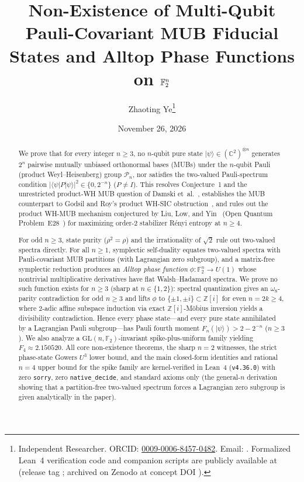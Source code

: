 \documentclass[11pt,a4paper]{article}
\title{\vspace*{-1.0cm}\bfseries Non-Existence of Multi-Qubit Pauli-Covariant MUB Fiducial States and Alltop Phase Functions on \texorpdfstring{$\F_2^n$}{F2\^{}n}}
\author{Zhaoting Ye\thanks{\raggedright Independent Researcher. ORCID: \href{https://orcid.org/0009-0006-8457-0482}{0009-0006-8457-0482}. Email: \href{mailto:lingyenbird@qq.com}{\lean{lingyenbird@qq.com}}. Formalized Lean~4 verification code and companion scripts are publicly available at \repoURL{} (release tag \lean{v1.1}; archived on Zenodo at concept DOI \href{https://doi.org/10.5281/zenodo.24566133}{\lean{10.5281/zenodo.24566133}}).}}
\date{November 26, 2026}
\theoremstyle{plain}
\theoremstyle{definition}
\theoremstyle{remark}
\newcommand{\C}{\mathbb{C}}
\newcommand{\F}{\mathbb{F}}
\newcommand{\Pauli}{\mathcal{P}}
\newcommand{\Zi}{\mathbb{Z}[i]}
\newcommand{\Uone}{U(1)}
\newcommand{\GL}{\mathrm{GL}}
\newcommand{\ket}[1]{|#1\rangle}
\newcommand{\expval}[2]{\langle#1|#2|#1\rangle}
\newcommand{\abs}[1]{\lvert#1\rvert}
\numberwithin{equation}{section}
\begin{document}
\maketitle
\vspace*{-3.2ex}

\begin{abstract}
We prove that for every integer $n \ge 3$, no $n$-qubit pure state $\ket{\psi} \in (\C^2)^{\otimes n}$ generates $2^n$ pairwise mutually unbiased orthonormal bases (MUBs) under the $n$-qubit Pauli (product Weyl--Heisenberg) group $\Pauli_n$, nor satisfies the two-valued Pauli-spectrum condition $\abs{\expval{\psi}{P}}^2 \in \{0, 2^{-n}\}$ ($P \neq I$). This resolves Conjecture~1 and the unrestricted product-WH MUB question of Damski et~al.~\cite{damski2026product}, establishes the MUB counterpart to Godsil and Roy's product WH-SIC obstruction~\cite{godsil2009equiangular}, and rules out the product WH-MUB mechanism conjectured by Liu, Low, and Yin~\cite{liu2026maximal} (Open Quantum Problem~E28~\cite{oqpE28}) for maximizing order-$2$ stabilizer R\'enyi entropy at $n \ge 4$.

For odd $n \ge 3$, state purity ($\rho^2 = \rho$) and the irrationality of $\sqrt{2}$ rule out two-valued spectra directly. For all $n \ge 1$, symplectic self-duality equates two-valued spectra with Pauli-covariant MUB partitions (with Lagrangian zero subgroup), and a matrix-free symplectic reduction produces an \emph{Alltop phase function} $\phi : \F_2^n \to \Uone$ whose nontrivial multiplicative derivatives have flat Walsh--Hadamard spectra. We prove no such function exists for $n \ge 3$ (sharp at $n \in \{1, 2\}$): spectral quantization gives an $\omega_8$-parity contradiction for odd $n \ge 3$ and lifts $\phi$ to $\{\pm 1, \pm i\} \subset \Zi$ for even $n = 2k \ge 4$, where $2$-adic affine subspace induction via exact $\Zi$-M\"obius inversion yields a divisibility contradiction. Hence every phase state---and every pure state annihilated by a Lagrangian Pauli subgroup---has Pauli fourth moment $F_n(\ket{\psi}) > 2 - 2^{-n}$ ($n \ge 3$). We also analyze a $\GL(n,\F_2)$-invariant spike-plus-uniform family yielding $F_4 \approx 2.150520$. All core non-existence theorems, the sharp $n = 2$ witnesses, the strict phase-state Gowers $U^3$ lower bound, and the main closed-form identities and rational $n = 4$ upper bound for the spike family are kernel-verified in Lean~4 (\texttt{v4.36.0}) with zero \texttt{sorry}, zero \texttt{native\_decide}, and standard axioms only (the general-$n$ derivation showing that a partition-free two-valued spectrum forces a Lagrangian zero subgroup is given analytically in the paper).
\end{abstract}
\end{document}
